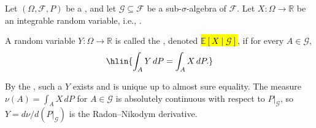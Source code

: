 \begin{definition} \label{definition:conditional_expectation}
Let $(\Omega, \mathcal{F}, P)$ be a , and let $\mathcal{G} \subseteq \mathcal{F}$ be a sub-$\sigma$-algebra of $\mathcal{F}$. Let $X: \Omega \to \mathbb{R}$ be an integrable random variable, i.e., .

A  random variable $Y: \Omega \to \mathbb{R}$ is called the , denoted \hl{$\mathbb{E}[X \mid \mathcal{G}]$}, if for every $A \in \mathcal{G}$,
$$\hlin{\int_A Y \, dP = \int_A X \, dP.}$$

By the , such a $Y$ exists and is unique up to almost sure equality. The measure $\nu(A) = \int_A X \, dP$ for $A \in \mathcal{G}$ is absolutely continuous with respect to $P|_{\mathcal{G}}$, so $Y = d\nu / d(P|_{\mathcal{G}})$ is the Radon--Nikodym derivative.
\end{definition}
